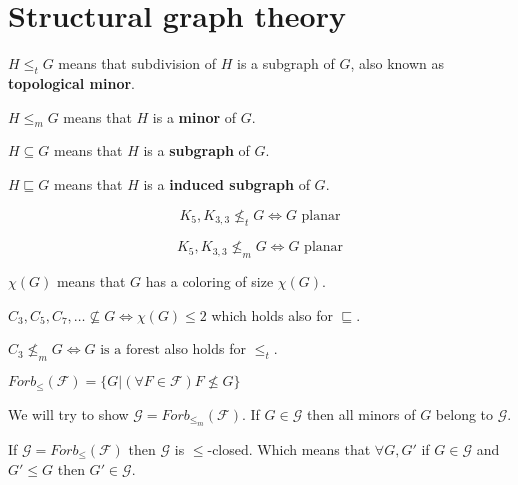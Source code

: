 \chapter{Structural graph theory}

\begin{defn}
	$H \leq_{t} G$ means that subdivision of $H$ is a subgraph of $G$, also known as \textbf{topological minor}.
\end{defn}

\begin{defn}
	$H \leq_{m} G$ means that $H$ is a \textbf{minor} of $G$.
\end{defn}

\begin{defn}
	$H \subseteq G$ means that $H$ is a \textbf{subgraph} of $G$.
\end{defn}

\begin{defn}
	$H \sqsubseteq G$ means that $H$ is a \textbf{induced subgraph} of $G$.
\end{defn}

\begin{thm}[Kuratowski]
	$$
	K_{5}, K_{3,3} \nleq_{t} G \Leftrightarrow G \text{ planar}
	$$
	
	$$
	K_{5}, K_{3,3} \nleq_{m} G \Leftrightarrow G \text{ planar}
	$$
\end{thm}

\begin{defn}
	$\chi(G)$ means that $G$ has a coloring of size $\chi(G)$.
\end{defn}

\begin{observ}
	$C_{3}, C_{5}, C_{7}, \dots \nsubseteq G \Leftrightarrow \chi(G) \leq 2$ which holds also for $\sqsubseteq$.
\end{observ}

\begin{observ}
	$C_{3} \nleq_{m} G \Leftrightarrow G \text{ is a forest}$ also holds for $\leq_{t}$.
\end{observ}

\begin{defn}
	$Forb_{\leq} (\mathcal{F}) = \{G | (\forall F \in \mathcal{F}) F \nleq G\}$
\end{defn}

We will try to show $\mathcal{G} = Forb_{\leq_{m}} (\mathcal{F})$. If $G \in \mathcal{G}$ then all minors of $G$ belong to $\mathcal{G}$.

\begin{observ}
	If $\mathcal{G} = Forb_{\leq}(\mathcal{F})$ then $\mathcal{G}$ is $\leq$-closed. Which means that $\forall G,G'$ if $G \in \mathcal{G}$ and $G' \leq G$ then $G' \in \mathcal{G}$.
\end{observ}

